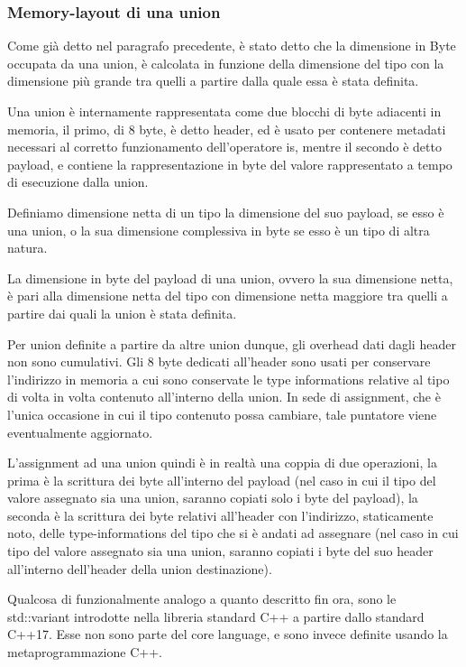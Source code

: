 \subsubsection{Memory-layout di una union}
Come già detto nel paragrafo precedente, è stato detto che la dimensione in Byte occupata da una union, è calcolata in funzione della dimensione del tipo con la dimensione più grande tra quelli a partire dalla quale essa è stata definita. 

Una union è internamente rappresentata come due blocchi di byte adiacenti in memoria, il primo, di 8 byte, è detto header, ed è usato per contenere metadati necessari al corretto funzionamento dell’operatore is, mentre il secondo è detto payload, e contiene la rappresentazione in byte del valore rappresentato a tempo di esecuzione dalla union.
 


Definiamo dimensione netta di un tipo la dimensione del suo payload, se esso è una union, o la sua dimensione complessiva in byte se esso è un tipo di altra natura.

La dimensione in byte del payload di una union, ovvero la sua dimensione netta, è pari alla dimensione netta del tipo con dimensione netta maggiore tra quelli a partire dai quali la union è stata definita.

Per union definite a partire da altre union dunque, gli overhead dati dagli header non sono cumulativi. Gli 8 byte dedicati all’header sono usati per conservare l’indirizzo in memoria a cui sono conservate le type informations relative al tipo di volta in volta contenuto all’interno della union. In sede di assignment, che è l’unica occasione in cui il tipo contenuto possa cambiare, tale puntatore viene eventualmente aggiornato.

L’assignment ad una union quindi è in realtà una coppia di due operazioni, la prima è la scrittura dei byte all’interno del payload (nel caso in cui il tipo del valore assegnato sia una union, saranno copiati solo i byte del payload), la seconda è la scrittura dei byte relativi all’header con l’indirizzo, staticamente noto, delle type-informations del tipo che si è andati ad assegnare (nel caso in cui tipo del valore assegnato sia una union, saranno copiati i byte del suo header all’interno dell’header della union destinazione).

Qualcosa di funzionalmente analogo a quanto descritto fin ora, sono le std::variant introdotte nella libreria standard C++ a partire dallo standard C++17. Esse non sono parte del core language, e sono invece definite usando la metaprogrammazione C++.